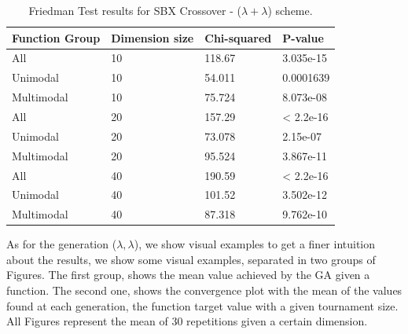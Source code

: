 \begin{table}[h]
	\centering
	\begin{tabular}{|l|l|l|l|}
		\hline
		\textbf{Function Group} & \textbf{Dimension size}      & \textbf{Chi-squared}        & \textbf{P-value}                     \\ \hline
		\multicolumn{1}{|l|}{All} & \multicolumn{1}{|l|}{10} & \multicolumn{1}{l|}{118.67} & \multicolumn{1}{l|}{3.035e-15} \\ \hline
		\multicolumn{1}{|l|}{Unimodal} & \multicolumn{1}{|l|}{10} & \multicolumn{1}{l|}{54.011} & \multicolumn{1}{l|}{0.0001639} \\ \hline
		\multicolumn{1}{|l|}{Multimodal} & \multicolumn{1}{|l|}{10} & \multicolumn{1}{l|}{75.724} & \multicolumn{1}{l|}{8.073e-08}  \\ \hline
		\hline
		\multicolumn{1}{|l|}{All} & \multicolumn{1}{|l|}{20} & \multicolumn{1}{l|}{157.29} & \multicolumn{1}{l|}{< 2.2e-16} \\ \hline
		\multicolumn{1}{|l|}{Unimodal} & \multicolumn{1}{|l|}{20} & \multicolumn{1}{l|}{73.078} & \multicolumn{1}{l|}{2.15e-07} \\ \hline
		\multicolumn{1}{|l|}{Multimodal} & \multicolumn{1}{|l|}{20} & \multicolumn{1}{l|}{95.524} & \multicolumn{1}{l|}{3.867e-11}  \\ \hline
		\hline	
		\multicolumn{1}{|l|}{All} & \multicolumn{1}{|l|}{40} & \multicolumn{1}{l|}{190.59} & \multicolumn{1}{l|}{< 2.2e-16} 						\\ \hline
		\multicolumn{1}{|l|}{Unimodal} & \multicolumn{1}{|l|}{40} & \multicolumn{1}{l|}{101.52} & \multicolumn{1}{l|}{3.502e-12} \\ \hline
		\multicolumn{1}{|l|}{Multimodal} & \multicolumn{1}{|l|}{40} & \multicolumn{1}{l|}{87.318} & \multicolumn{1}{l|}{9.762e-10}  \\ \hline
	\end{tabular}
	\caption{Friedman Test results for SBX Crossover - ($\lambda + \lambda$) scheme.}
	\label{Friedman_test_uniform-B}	
\end{table}

As for the generation ($\lambda, \lambda$), we show visual examples to get a finer intuition about the results, we show  some visual examples, separated in two groups of Figures. The first group, shows the mean value achieved by the GA given a function. The second one, shows the convergence plot with the mean of the values found at each generation, the function target value with a given tournament size. All Figures represent the mean of 30 repetitions given a certain dimension.




